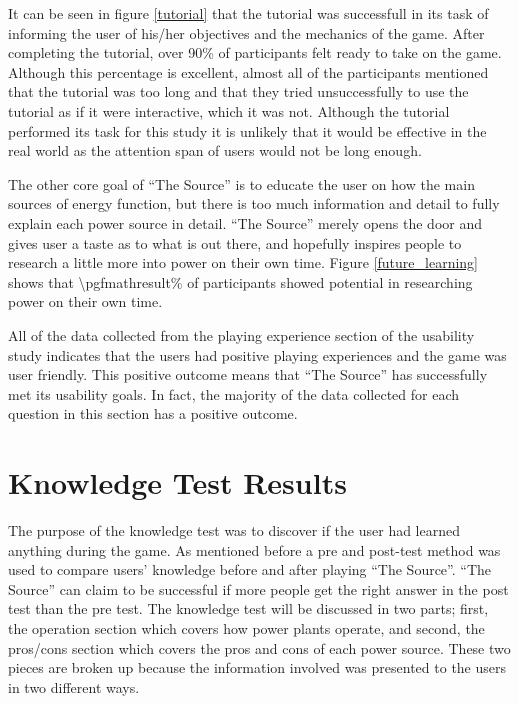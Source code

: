 \documentclass[msc,oneside]{ubcthesis}%
\newcommand{\percent}[2]{\pgfmathparse{#1*100/#2} \num{\pgfmathresult}\%}
\begin{document}
It can be seen in figure \ref{tutorial} that the tutorial was successfull in its task of informing the user of his/her objectives and the mechanics of the game. After completing the tutorial, over 90\% of participants felt ready to take on the game. Although this percentage is excellent, almost all of the participants mentioned that the tutorial was too long and that they tried unsuccessfully to use the tutorial as if it were interactive, which it was not. Although the tutorial performed its task for this study it is unlikely that it would be effective in the real world as the attention span of users would not be long enough.

The other core goal of ``The Source'' is to educate the user on how the main sources of energy function, but there is too much information and detail to fully explain each power source in detail. ``The Source'' merely opens the door and gives user a taste as to what is out there, and hopefully inspires people to research a little more into power on their own time. Figure \ref{future_learning} shows that \percent{11}{17} of participants showed potential in researching power on their own time. 


All of the data collected from the playing experience section of the usability study indicates that the users had positive playing experiences and the game was user friendly. This positive outcome means that ``The Source'' has successfully met its usability goals. In fact, the majority of the data collected for each question in this section has a positive outcome.  

\section{Knowledge Test Results}
\indent The purpose of the knowledge test was to discover if the user had learned anything during the game. As mentioned before a pre and post-test method was used to compare users' knowledge before and after playing ``The Source''. ``The Source'' can claim to be successful if more people get the right answer in the post test than the pre test. The knowledge test will be discussed in two parts; first, the operation section which covers how power plants operate, and second, the pros/cons section which covers the pros and cons of each power source. These two pieces are broken up because the information involved was presented to the users in two different ways.
\end{document}

